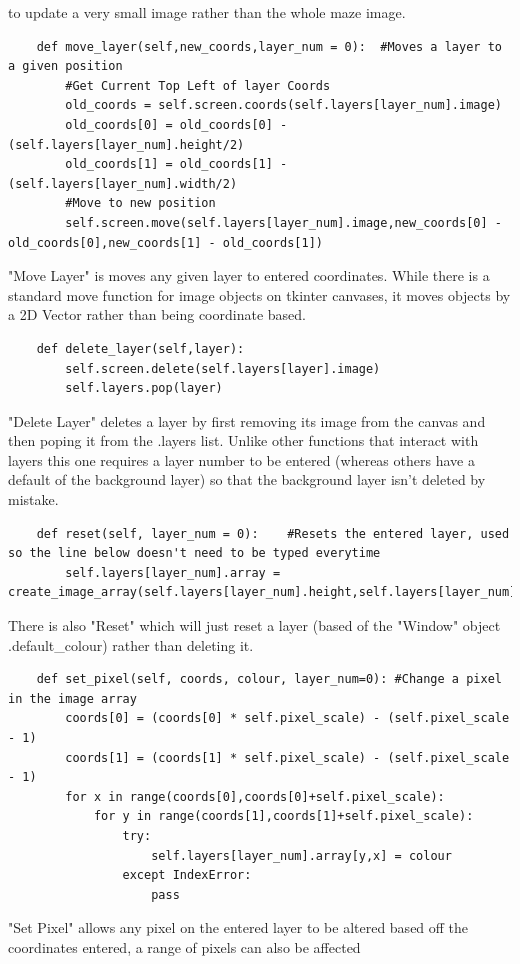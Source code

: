 to update a very small image rather than the whole maze image. 
\begin{lstlisting}
    def move_layer(self,new_coords,layer_num = 0):  #Moves a layer to a given position
        #Get Current Top Left of layer Coords
        old_coords = self.screen.coords(self.layers[layer_num].image)
        old_coords[0] = old_coords[0] - (self.layers[layer_num].height/2)
        old_coords[1] = old_coords[1] - (self.layers[layer_num].width/2)
        #Move to new position
        self.screen.move(self.layers[layer_num].image,new_coords[0] - old_coords[0],new_coords[1] - old_coords[1])
\end{lstlisting}
"Move Layer" is moves any given layer to entered coordinates. While there is a standard move function for image objects on
tkinter canvases, it moves objects by a 2D Vector rather than being coordinate based.
\begin{lstlisting}
    def delete_layer(self,layer):
        self.screen.delete(self.layers[layer].image)
        self.layers.pop(layer) 
\end{lstlisting}
"Delete Layer" deletes a layer by first removing its image from the canvas and then poping it from the .layers list. Unlike other functions
that interact with layers this one requires a layer number to be entered (whereas others have a default of the background layer) so that
the background layer isn't deleted by mistake. 
\begin{lstlisting}
    def reset(self, layer_num = 0):    #Resets the entered layer, used so the line below doesn't need to be typed everytime
        self.layers[layer_num].array = create_image_array(self.layers[layer_num].height,self.layers[layer_num].width,self.layers[layer_num].default_colour)
\end{lstlisting}
There is also "Reset" which will just reset a layer (based of the "Window" object .default\_colour) rather than deleting it.
\begin{lstlisting}
    def set_pixel(self, coords, colour, layer_num=0): #Change a pixel in the image array
        coords[0] = (coords[0] * self.pixel_scale) - (self.pixel_scale - 1)
        coords[1] = (coords[1] * self.pixel_scale) - (self.pixel_scale - 1)
        for x in range(coords[0],coords[0]+self.pixel_scale):
            for y in range(coords[1],coords[1]+self.pixel_scale):
                try:
                    self.layers[layer_num].array[y,x] = colour
                except IndexError:
                    pass   
\end{lstlisting}
"Set Pixel" allows any pixel on the entered layer to be altered based off the coordinates entered, a range of pixels can also be affected 
